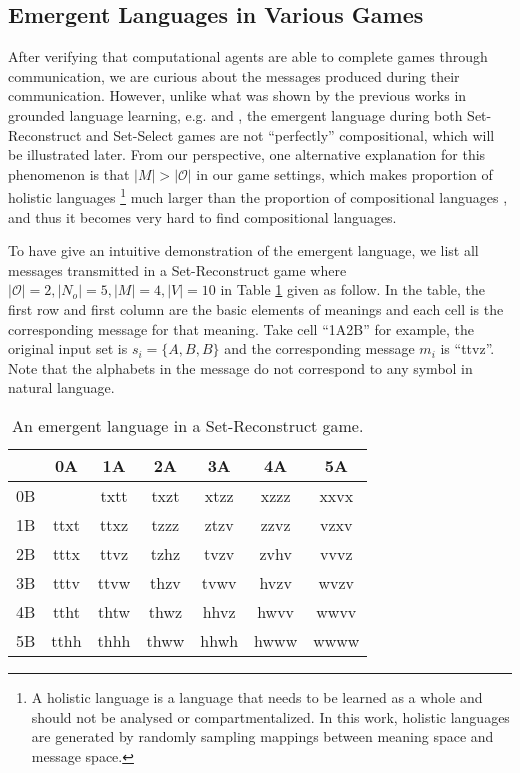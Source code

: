 \subsection{Emergent Languages in Various Games}
\label{ssec4.2.1:emergent_languages}

After verifying that computational agents are able to complete games through communication, we are curious about the messages produced during their communication. However, unlike what was shown by the previous works in grounded language learning, e.g. \cite{hill2017understanding} and \cite{mordatch2018emergence}, the emergent language during both Set-Reconstruct and Set-Select games are not ``perfectly'' compositional, which will be illustrated later. From our perspective, one alternative explanation for this phenomenon is that $|M| > |\mathcal{O}|$ in our game settings, which makes proportion of holistic languages \footnote{A holistic language is a language that needs to be learned as a whole and should not be analysed or compartmentalized. In this work, holistic languages are generated by randomly sampling mappings between meaning space and message space.} much larger than the proportion of compositional languages \cite{brighton2002compositional}, and thus it becomes very hard to find compositional languages.

To have give an intuitive demonstration of the emergent language, we list all messages transmitted in a Set-Reconstruct game where $|\mathcal{O}|=2, |N_o|=5, |M|=4, |V|=10$ in Table \ref{tab4.2:emregent_language_generation} given as follow. In the table, the first row and first column are the basic elements of meanings and each cell is the corresponding message for that meaning. Take cell ``1A2B'' for example, the original input set is $s_i=\{A,B,B\}$ and the corresponding message $m_i$ is ``ttvz''. Note that the alphabets in the message do not correspond to any symbol in natural language.

\begin{table}[!h]
    \centering
    \begin{tabular}{|c|c|c|c|c|c|c|}
        \hline
           & 0A   & 1A   & 2A   & 3A   & 4A   & 5A   \\ \hline
        0B &      & txtt & txzt & xtzz & xzzz & xxvx \\ \hline
        1B & ttxt & ttxz & tzzz & ztzv & zzvz & vzxv \\ \hline
        2B & tttx & ttvz & tzhz & tvzv & zvhv & vvvz \\ \hline
        3B & tttv & ttvw & thzv & tvwv & hvzv & wvzv \\ \hline
        4B & ttht & thtw & thwz & hhvz & hwvv & wwvv \\ \hline
        5B & tthh & thhh & thww & hhwh & hwww & wwww \\ \hline
        \end{tabular}
    \caption{An emergent language in a Set-Reconstruct game.}
    \label{tab4.2:emregent_language_generation}
\end{table}

